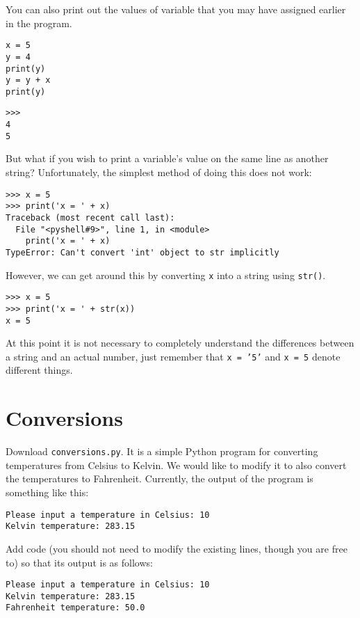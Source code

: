 \documentclass[12pt]{article}
\begin{document}
You can also print out the values of variable that you may have assigned earlier in the program.

\begin{lstlisting}[style=c]
x = 5
y = 4
print(y)
y = y + x
print(y)
\end{lstlisting}

\begin{lstlisting}[style=bash]
>>> 
4
5
\end{lstlisting}

But what if you wish to print a variable's value on the same line as another string? Unfortunately, the simplest method of doing this does not work:

\begin{lstlisting}[style=bash]
>>> x = 5
>>> print('x = ' + x)
Traceback (most recent call last):
  File "<pyshell#9>", line 1, in <module>
    print('x = ' + x)
TypeError: Can't convert 'int' object to str implicitly
\end{lstlisting}

However, we can get around this by converting \texttt{x} into a string using \texttt{str()}.

\begin{lstlisting}[style=bash]
>>> x = 5
>>> print('x = ' + str(x))
x = 5
\end{lstlisting}

At this point it is not necessary to completely understand the differences between a string and an actual number, just remember that \texttt{x = '5'} and \texttt{x = 5} denote different things.

\pagebreak

\section{Conversions}
Download \texttt{conversions.py}. It is a simple Python program for converting temperatures from Celsius to Kelvin. We would like to modify it to also convert the temperatures to Fahrenheit. Currently, the output of the program is something like this:

\begin{lstlisting}[style=c]
Please input a temperature in Celsius: 10
Kelvin temperature: 283.15
\end{lstlisting}

Add code (you should not need to modify the existing lines, though you are free to) so that its output is as follows:

\begin{lstlisting}[style=c]
Please input a temperature in Celsius: 10
Kelvin temperature: 283.15
Fahrenheit temperature: 50.0
\end{lstlisting}
\end{document}
